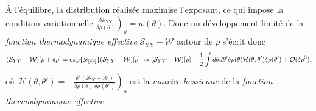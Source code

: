 À l’équilibre, la distribution réalisée maximise l’exposant, ce qui impose la
condition variationnelle
\(
\left . \frac{\delta \mathcal{S}_{\mathrm{YY}}}{\delta \rho(\theta)} \right )_\rho = w(\theta) .
\)
Donc un développement limité de la {\em fonction thermodynamique effective} $\mathcal{S}_{\mathrm{YY}} - \mathcal{W}$ autour de $\rho$ s'écrit donc
\begin{eqnarray}
    (\mathcal{S}_{YY} - \mathcal{W})[\rho + \delta \rho ]  = \exp \{\dfonc{\delta \rho }\} ( \mathcal{S}_{YY} - \mathcal{W})[\rho]  \approx (\mathcal{S}_{YY} - \mathcal{W})[\rho]   - \frac{1}{2} \int d\theta d \theta' \delta \rho(\theta) \mathcal{H}(\theta, \theta' )\delta \rho(\theta') + \mathcal{O}(\delta \rho^3),
\end{eqnarray}
où
\(
\displaystyle \mathcal{H}(\theta, \theta' ) = -\left.\frac{\delta^{2}(\mathcal{S}_{YY}-\mathcal{W})}{\delta\rho(\theta)\,\delta\rho(\theta')}\right)_{\rho}
\)
est la \emph{matrice hessienne} de la {\em fonction thermodynamique effective}.


